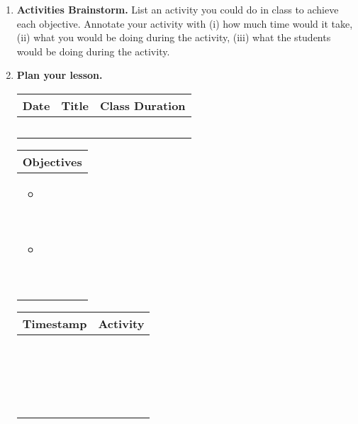 \documentclass{book}
\begin{document}
\begin{enumerate}
\begin{enumerate}
		\item[\bfseries Objective 1:] ~
		\item[\bfseries Objective 2:] ~
		\end{enumerate}

	\item \textbf{Activities Brainstorm.} List an activity you could
	do in class to achieve each objective. Annotate your activity
	with (i) how much time would it take, (ii) what you would be
	doing during the activity, (iii) what the students would be
	doing during the activity.

	\newpage
	\item \textbf{Plan your lesson.}

		\begin{tabularx}{\textwidth}{|s|X|s|}
			\hline
			Date & Title & Class Duration\\
			\hline
			\rule[-.3\baselineskip]{0pt}{1.5cm}~&~&~\\
			\hline
		\end{tabularx}
		
		\begin{tabularx}{\textwidth}{|X|}
			\hline
			Objectives\\
			\hline
			\begin{itemize}
				\item ~

				\rule[-.3\baselineskip]{0pt}{1.5cm}~
				\item ~

				\rule[-.3\baselineskip]{0pt}{1.5cm}~
			\end{itemize}\\
			\hline
		\end{tabularx}
		
		\begin{tabularx}{\textwidth}{|c|X|}
			\hline
			Timestamp & Activity\\
			\hline
				\rule[-.3\baselineskip]{0pt}{3.2cm}~ & ~\\
			\hline
				\rule[-.3\baselineskip]{0pt}{3.2cm}~ & ~\\
			\hline
				\rule[-.3\baselineskip]{0pt}{3.2cm}~ & ~\\
			\hline
				\rule[-.3\baselineskip]{0pt}{3.2cm}~ & ~\\
			\hline
		\end{tabularx}
		

\end{enumerate}
\end{document}
